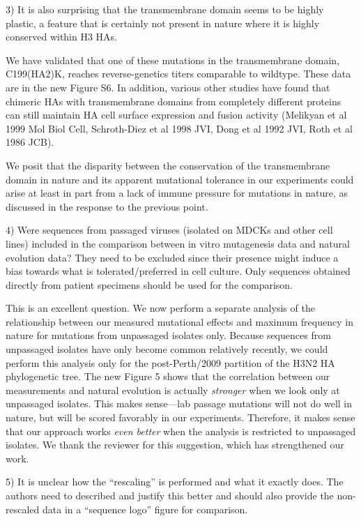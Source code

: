 \documentclass[11pt, oneside]{article}   	%
\newcommand{\response}[1]{{\color{black}#1}}
\begin{document}
3) It is also surprising that the transmembrane domain seems to be highly plastic, a feature that is certainly not present in nature where it is highly conserved within H3 HAs. 

\response{We have validated that one of these mutations in the transmembrane domain, C199(HA2)K, reaches reverse-genetics titers comparable to wildtype.
These data are in the new Figure S6.
In addition, various other studies have found that chimeric HAs with transmembrane domains from completely different proteins can still maintain HA cell surface expression and fusion activity (Melikyan et al 1999 Mol Biol Cell, Schroth-Diez et al 1998 JVI, Dong et al 1992 JVI, Roth et al 1986 JCB).

We posit that the disparity between the conservation of the transmembrane domain in nature and its apparent mutational tolerance in our experiments could arise at least in part from a lack of immune pressure for mutations in nature, as discussed in the response to the previous point.
}

4) Were sequences from passaged viruses (isolated on MDCKs and other cell lines) included in the comparison between in vitro mutagenesis data and natural evolution data? They need to be excluded since their presence might induce a bias towards what is tolerated/preferred in cell culture. Only sequences obtained directly from patient specimens should be used for the comparison. 

\response{
This is an excellent question.
We now perform a separate analysis of the relationship between our measured mutational effects and maximum frequency in nature for mutations from unpassaged isolates only.
Because sequences from unpassaged isolates have only become common relatively recently, we could perform this analysis only for the post-Perth/2009 partition of the H3N2 HA phylogenetic tree.
The new Figure 5 shows that the correlation between our measurements and natural evolution is actually \emph{stronger} when we look only at unpassaged isolates.
This makes sense---lab passage mutations will not do well in nature, but will be scored favorably in our experiments.
Therefore, it makes sense that our approach works \emph{even better} when the analysis is restricted to unpassaged isolates.
We thank the reviewer for this suggestion, which has strengthened our work.
}

5) It is unclear how the ``rescaling'' is performed and what it exactly does. The authors need to described and justify this better and should also provide the non-rescaled data in a ``sequence logo'' figure for comparison. 
\end{document}
